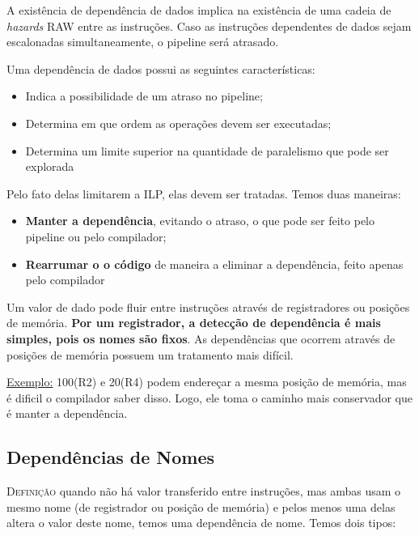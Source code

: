 A existência de dependência de dados implica na existência de uma cadeia de \textit{hazards} RAW entre as instruções. Caso as instruções dependentes de dados sejam escalonadas simultaneamente, o pipeline será atrasado.

Uma dependência de dados possui as seguintes características:
\begin{itemize}
  \item Indica a possibilidade de um atraso no pipeline;
  \item Determina em que ordem as operações devem ser executadas;
  \item Determina um limite superior na quantidade de paralelismo que pode ser explorada
\end{itemize}

Pelo fato delas limitarem a ILP, elas devem ser tratadas. Temos duas maneiras:
\begin{itemize}
  \item \textbf{Manter a dependência}, evitando o atraso, o que pode ser feito pelo pipeline ou pelo compilador;

  \item \textbf{Rearrumar o o código} de maneira a eliminar a dependência, feito apenas pelo compilador
\end{itemize}

Um valor de dado pode fluir entre instruções através de registradores ou posições de memória. \textbf{Por um registrador, a detecção de dependência é mais simples, pois os nomes são fixos}. As dependências que ocorrem através de posições de memória possuem um tratamento mais difícil.

\underline{Exemplo:} 100(R2) e 20(R4) podem endereçar a mesma posição de memória, mas é dificil o compilador saber disso. Logo, ele toma o caminho mais conservador que é manter a dependência.





\subsection{Dependências de Nomes}
\textsc{Definição} quando não há valor transferido entre instruções, mas ambas usam o mesmo nome (de registrador ou posição de memória) e pelos menos uma delas altera o valor deste nome, temos uma dependência de nome. Temos dois tipos:

